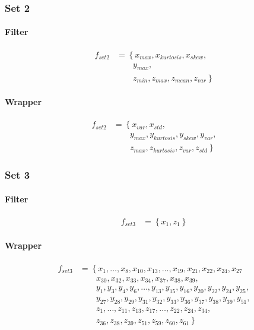 \documentclass[USenglish]{ifimaster}  %
\begin{document}
\subsubsection{Set 2}
\paragraph{Filter}
\begin{align}
f_{set2} &= \left\{x_{max}, x_{kurtosis}, x_{skew}, \right.\nonumber\\
&\qquad \left.{} y_{max}, \right.\nonumber\\
&\qquad \left.{} z_{min}, z_{max}, z_{mean}, z_{var} \right\}
\end{align}

\paragraph{Wrapper}
\begin{align}
f_{set2} &= \left\{x_{var}, x_{std}, \right.\nonumber\\
&\qquad \left.{} y_{max}, y_{kurtosis}, y_{skew}, y_{var}, \right.\nonumber\\
&\qquad \left.{} z_{max}, z_{kurtosis}, z_{var}, z_{std} \right\}
\end{align}


\subsubsection{Set 3}
\paragraph{Filter}
\begin{align}
f_{set3} &= \left\{x_{1}, z_{1} \right\}
\end{align}


\paragraph{Wrapper}
\begin{align}
f_{set3} &= \left\{x_{1},\dotsc,x_{8}, x_{10},x_{13},\dotsc,x_{19},x_{21},x_{22},x_{24},x_{27} \right.\nonumber\\
&\qquad \left.{}  x_{30},x_{32},x_{33},x_{34},x_{37},x_{38},x_{39}, \right.\nonumber\\
&\qquad \left.{}  y_{1},y_{3},y_{4},y_{6},\dotsc,y_{13},y_{15},y_{16},y_{20},y_{22},y_{24},y_{25}, \right.\nonumber\\
&\qquad \left.{} y_{27},y_{28},y_{29},y_{31},y_{32},y_{33},y_{36},y_{37},y_{38},y_{39},y_{51}, \right.\nonumber\\
&\qquad \left.{} z_{1},\dotsc,z_{11},z_{13},z_{17},\dotsc,z_{22},z_{24},z_{34},  \right.\nonumber\\
&\qquad \left.{} z_{36},z_{38},z_{39},z_{51},z_{59},z_{60},z_{61} \right\}
\end{align}
\end{document}
